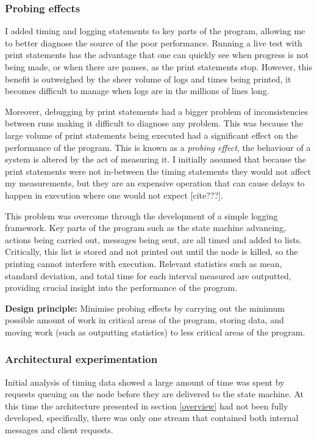 \subsubsection{Probing effects}
I added timing and logging statements to key parts of the program, allowing me to better diagnose the source of the poor performance. Running a live test with print statements has the advantage that one can quickly see when progress is not being made, or when there are pauses, as the print statements stop. However, this benefit is outweighed by the sheer volume of logs and times being printed, it becomes difficult to manage when logs are in the millions of lines long.

Moreover, debugging by print statements had a bigger problem of inconsistencies between runs making it difficult to diagnose any problem. This was because the large volume of print statements being executed had a significant effect on the performance of the program. This is known as a \textit{probing effect}, the behaviour of a system is altered by the act of measuring it. I initially assumed that because the print statements were not in-between the timing statements they would not affect my measurements, but they are an expensive operation that can cause delays to happen in execution where one would not expect [cite???].

This problem was overcome through the development of a simple logging framework. Key parts of the program such as the state machine advancing, actions being carried out, messages being sent, are all timed and added to lists. Critically, this list is stored and not printed out until the node is killed, so the printing cannot interfere with execution. Relevant statistics such as mean, standard deviation, and total time for each interval measured are outputted, providing crucial insight into the performance of the program.

\textbf{Design principle: } Minimise probing effects by carrying out the minimum possible amount of work in critical areas of the program, storing data, and moving work (such as outputting statistics) to less critical areas of the program.

\subsubsection{Architectural experimentation}
Initial analysis of timing data showed a large amount of time was spent by requests queuing on the node before they are delivered to the state machine. At this time the architecture presented in section \ref{overview} had not been fully developed, specifically, there was only one stream that contained both internal messages and client requests.


